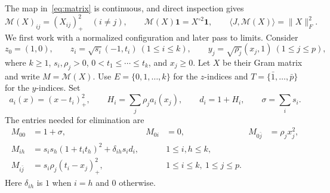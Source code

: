 \documentclass[11pt]{article}
\theoremstyle{remark}
\newcommand{\M}{\mathcal M}
\newcommand{\ip}[2]{\langle #1,#2\rangle}
\newcommand{\fro}[1]{\lVert #1\rVert_F}
\begin{document}
The map in~\eqref{eq:matrix} is continuous, and direct inspection gives
\begin{equation}\label{eq:mass}
 \M(X)_{ij}=(X_{ij})_+^2\quad(i\ne j),\qquad
 \M(X)\mathbf1=X^{\circ2}\mathbf1,\qquad
 \ip{J}{\M(X)}=\fro{X}^2.
\end{equation}
We first work with a normalized configuration and later pass to limits.
Consider
\begin{equation}\label{eq:coordinates}
 z_0=(1,0),\qquad z_i=\sqrt{s_i}(-1,t_i)\ (1\le i\le k),\qquad
 y_j=\sqrt{\rho_j}(x_j,1)\ (1\le j\le p),
\end{equation}
where $k\ge1$, $s_i,\rho_j>0$, $0<t_1\le\cdots\le t_k$, and $x_j\ge0$.
Let $X$ be their Gram matrix and write $M=\M(X)$.
Use $E=\{0,1,\ldots,k\}$ for the $z$-indices and
$T=\{\bar1,\ldots,\bar p\}$ for the $y$-indices.
Set
\[
 a_i(x)=(x-t_i)_+^2,\qquad H_i=\sum_j\rho_j a_i(x_j),\qquad
 d_i=1+H_i,\qquad \sigma=\sum_i s_i.
\]
The entries needed for elimination are
\begin{equation}\label{eq:blocks}
\begin{aligned}
 M_{00}&=1+\sigma,& M_{0i}&=0,& M_{0\bar j}&=\rho_jx_j^2,\\
 M_{ih}&=s_is_h(1+t_it_h)^2+\delta_{ih}s_id_i,
 &&1\le i,h\le k,\\
 M_{i\bar j}&=s_i\rho_j(t_i-x_j)_+^2,
 &&1\le i\le k,\ 1\le j\le p.
\end{aligned}
\end{equation}
Here $\delta_{ih}$ is $1$ when $i=h$ and $0$ otherwise.
\end{document}
